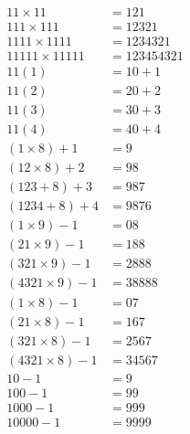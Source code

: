 \begin{align*}
11\times 11 &= 121 \\ %
111 \times 111 &= 12321\\
1111 \times 1111 &= 1234321 \\
11111 \times 11111 &= 123454321\\[0.5cm]
11(1) &= 10+1\\ %
11(2) &= 20+2\\
11(3) &= 30+3\\
11(4) &= 40+4\\[0.5cm]
(1\times 8) + 1 &= 9\\ %
(12 \times 8) +2 &=98 \\
(123 + 8)+3 &=987\\
(1234 + 8)+4 &=9876\\[0.5cm]
(1\times 9) - 1 &= 08\\ %
(21 \times 9) - 1 &= 188\\
(321 \times 9) - 1 &= 2888\\
(4321 \times 9)-1 &= 38888\\[0.5cm]
(1 \times 8) - 1 &= 07\\ %
(21\times 8) - 1 &= 167\\
(321 \times 8)-1 &= 2567\\
(4321 \times 8) -1 &=34567\\[0.5cm]
10-1 &= 9\\ %
100-1 &= 99\\
1000-1 &= 999\\
10000 - 1 &= 9999\\
\end{align*}
